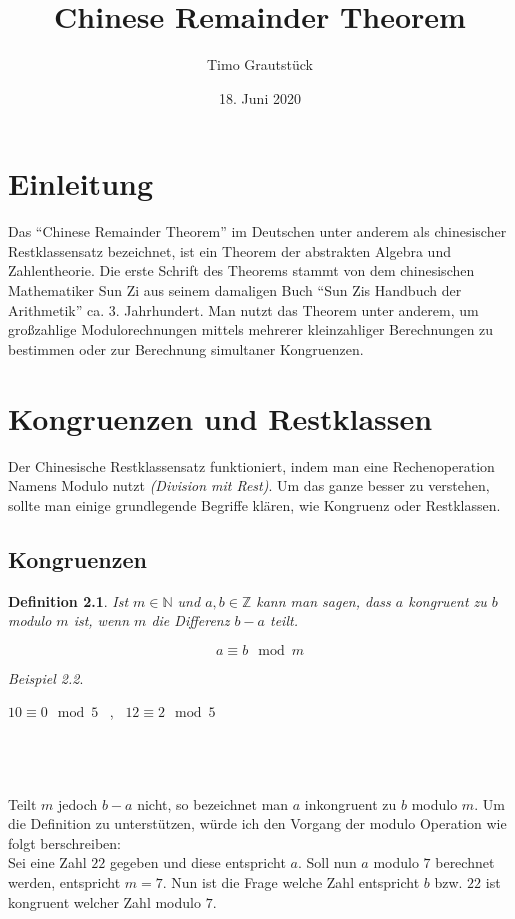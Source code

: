 \documentclass{scrreprt}
\title{Chinese Remainder Theorem}
\author{Timo Grautstück}
\date{18. Juni 2020}
\newtheorem{definition}{Definition}[section]
\theoremstyle{remark}
\newtheorem{beispiel}[definition]{Beispiel}
\begin{document}
\maketitle
\tableofcontents

\chapter{Einleitung}
Das ``Chinese Remainder Theorem'' im Deutschen unter anderem als chinesischer Restklassensatz bezeichnet, ist ein Theorem der abstrakten Algebra und Zahlentheorie. Die erste Schrift des Theorems stammt von dem chinesischen Mathematiker Sun Zi aus seinem damaligen Buch ``Sun Zis Handbuch der Arithmetik'' ca. 3. Jahrhundert.
Man nutzt das Theorem unter anderem, um großzahlige Modulorechnungen  mittels mehrerer kleinzahliger Berechnungen zu bestimmen oder zur Berechnung simultaner Kongruenzen.

\chapter{Kongruenzen und Restklassen}
Der Chinesische Restklassensatz funktioniert, indem man eine Rechenoperation Namens Modulo nutzt \textit{(Division mit Rest)}. Um das ganze besser zu verstehen, sollte man einige grundlegende Begriffe klären, wie Kongruenz oder Restklassen.

\section{Kongruenzen}
\begin{definition}
  Ist $m\in\mathbb{N}$ und $a,b\in\mathbb{Z}$ kann man sagen, dass $a$ kongruent zu $b$ modulo $m$ ist, wenn $m$ die Differenz $b-a$ teilt.
\end{definition}

\[
\boxed{a\equiv b\mod m}
\]

\begin{beispiel}
\end{beispiel}
\begin{center}
  $10 \equiv 0 \mod 5$ \,\,\,,\,\,\, $12 \equiv 2 \mod 5$
\end{center}\\
\hrulefill\\\\
Teilt $m$ jedoch $b-a$ nicht, so bezeichnet man $a$ inkongruent zu $b$ modulo $m$. Um die Definition zu unterstützen, würde ich den Vorgang der modulo Operation wie folgt berschreiben:\\
Sei eine Zahl $22$ gegeben und diese entspricht $a$. Soll nun $a$ modulo $7$ berechnet werden, entspricht $m = 7$. Nun ist die Frage welche Zahl entspricht $b$ bzw. $22$ ist kongruent welcher Zahl modulo $7$.
\end{document}
